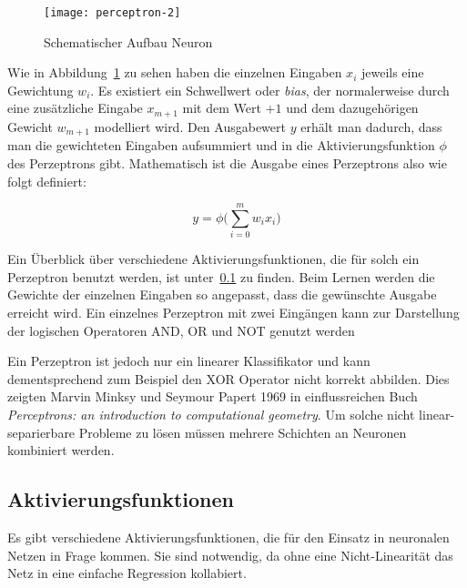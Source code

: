 \begin{figure}[h]
    \centering
	\texttt{[image: perceptron-2]}
	\caption{Schematischer Aufbau Neuron}
	\label{fig:singleNeuron}
\end{figure}

Wie in Abbildung~\ref{fig:singleNeuron} zu sehen haben die einzelnen Eingaben \(x_i\) jeweils eine Gewichtung \(w_i\).
Es existiert ein Schwellwert oder \textit{bias}, der normalerweise 
durch eine zusätzliche Eingabe \(x_{m+1}\) mit dem Wert \(+1\) und dem dazugehörigen Gewicht \(w_{m+1}\) modelliert wird.
Den Ausgabewert \(y\) erhält man dadurch, dass man die gewichteten Eingaben aufsummiert und in die Aktivierungsfunktion \( \phi \) des Perzeptrons gibt.
Mathematisch ist die Ausgabe eines Perzeptrons also wie folgt definiert:

\begin{equation}
	y = \phi \Big( \sum_{i= 0}^{m} w_i x_i \Big)
\end{equation}

Ein Überblick über verschiedene Aktivierungsfunktionen, die für solch ein Perzeptron benutzt werden, ist unter~\ref{sec:activationfuncs} zu finden.
Beim Lernen werden die Gewichte der einzelnen Eingaben so angepasst, dass die gewünschte Ausgabe erreicht wird.
Ein einzelnes Perzeptron mit zwei Eingängen kann zur Darstellung der logischen Operatoren AND, OR und NOT genutzt werden

Ein Perzeptron ist jedoch nur ein linearer Klassifikator und kann dementsprechend zum Beispiel den XOR Operator nicht korrekt abbilden.
Dies zeigten Marvin Minksy und Seymour Papert 1969 in einflussreichen Buch \textit{Perceptrons: an introduction to computational geometry}. 
Um solche nicht linear-separierbare Probleme zu lösen müssen mehrere Schichten an Neuronen kombiniert werden.

\subsection{Aktivierungsfunktionen}
\label{sec:activationfuncs}
Es gibt verschiedene Aktivierungsfunktionen, die für den Einsatz in neuronalen Netzen in Frage kommen.
Sie sind notwendig, da ohne eine Nicht-Linearität das Netz in eine einfache Regression kollabiert.

